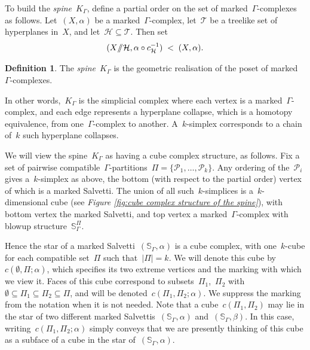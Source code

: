 \documentclass[11pt]{amsart}
\theoremstyle{definition}
\theoremstyle{definition}
\theoremstyle{definition}
\theoremstyle{definition}
\newtheorem{definition}[theorem]{Definition}
\newcommand{\calP}{\mathcal{P}} %
\newcommand{\sal}{\mathbb{S}_{\Gamma}} %
\newcommand{\salb}[1]{\mathbb{S}_\Gamma^{#1}} %
\newcommand{\spine}{K_{\Gamma}} %
\newcommand{\ssslash}{\smash{\sslash}} %
\begin{document}
To build the \emph{spine}~$\spine$, define a partial order on the set of marked~$\Gamma$-complexes as follows. Let~$(X, \alpha)$ be a marked~$\Gamma$-complex, let~$\mathcal{T}$ be a treelike set of hyperplanes in~$X$, and let~$\mathcal{H} \subseteq \mathcal{T}$. Then set \[(X \ssslash \mathcal{H}, \alpha \circ c_\mathcal{H}^{-1}) \;<\; (X, \alpha).\]

\begin{definition}\label{def:untwisted spine}
    The \emph{spine}~$\spine$ is the geometric realisation of the poset of marked~$\Gamma$-complexes.
\end{definition}

In other words,~$\spine$ is the simplicial complex where each vertex is a marked~$\Gamma$-complex, and each edge represents a hyperplane collapse, which is a homotopy equivalence, from one~$\Gamma$-complex to another. A~$k$-simplex corresponds to a chain of~$k$ such hyperplane collapses.

We will view the spine~$\spine$ as having a cube complex structure, as follows. Fix a set of pairwise compatible~$\Gamma$-partitions~$\Pi = \{\calP_1, \dots, \calP_k\}$. Any ordering of the~$\calP_i$ gives a~$k$-simplex as above, the bottom (with respect to the partial order) vertex of which is a marked Salvetti. The union of all such~$k$-simplices is a~$k$-dimensional cube (see \textit{Figure \ref{fig:cube complex structure of the spine}}), with bottom vertex the marked Salvetti, and top vertex a marked~$\Gamma$-complex with blowup structure~$\salb{\Pi}$. 

Hence the star of a marked Salvetti~$(\sal, \alpha)$ is a cube complex, with one~$k$-cube for each compatible set~$\Pi$ such that~$\vert \Pi \vert = k$. We will denote this cube by~$c\left(\emptyset, \Pi; \alpha\right)$, which specifies its two extreme vertices and the marking with which we view it. Faces of this cube correspond to subsets~$\Pi_1$,~$\Pi_2$ with~$\emptyset \subseteq \Pi_1 \subseteq \Pi_2 \subseteq \Pi$, and will be denoted~$c\left(\Pi_1, \Pi_2; \alpha\right)$. We suppress the marking from the notation when it is not needed. Note that a cube~$c\left(\Pi_1, \Pi_2\right)$ may lie in the star of two different marked Salvettis~$(\sal, \alpha)$ and~$(\sal, \beta)$. In this case, writing~$c\left(\Pi_1, \Pi_2; \alpha\right)$ simply conveys that we are presently thinking of this cube as a subface of a cube in the star of~$(\sal, \alpha)$.
\end{document}
